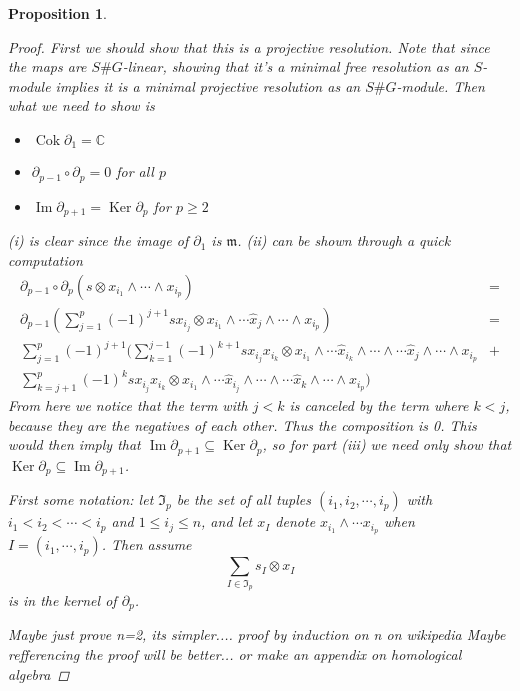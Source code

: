 \documentclass[11pt, a4paper, english]{article}
\newtheorem{prop}{Proposition}
\numberwithin{prop}{section}
\numberwithin{lemma}{section}
\numberwithin{theorem}{section}
\numberwithin{defin}{section}
\numberwithin{example}{section}
\newcommand{\C}{\mathbb{C}}
\DeclareMathOperator{\Image}{Im}
\DeclareMathOperator{\Ker}{Ker}
\DeclareMathOperator{\Cok}{Cok}
\begin{document}
\begin{prop}
\begin{proof}
First we should show that this is a projective resolution. Note that since the maps are $S\#G$-linear, showing that it's a minimal free resolution as an $S$-module implies it is a minimal projective resolution as an $S\#G$-module. Then what we need to show is 
\begin{itemize}
\item[(i)] $\Cok \partial_1 = \C$
\item[(ii)] $\partial_{p-1} \circ \partial_{p} = 0$ for all $p$
\item[(iii)] $\Image \partial_{p+1} = \Ker \partial_p$ for $p \geq 2$
\end{itemize}
(i) is clear since the image of $\partial_1$ is $\mathfrak{m}$. (ii) can be shown through a quick computation
\begin{align*}
\partial_{p-1} \circ \partial_{p}(s \otimes x_{i_1} \wedge \cdots \wedge x_{i_p}) &=\\ 
\partial_{p-1} \left(\sum_{j=1}^p (-1)^{j+1} sx_{i_j} \otimes x_{i_1} \wedge \cdots \hat{x}_j \wedge \cdots \wedge x_{i_p} \right)&=\\
\sum_{j=1}^p (-1)^{j+1} \Bigg(\sum_{k=1}^{j-1} (-1)^{k+1} sx_{i_j}x_{i_k} \otimes x_{i_1}\wedge \cdots \hat{x}_{i_k} \wedge \cdots \wedge \cdots \hat{x}_j \wedge \cdots \wedge x_{i_p}& +\\
\sum_{k=j+1}^{p} (-1)^k sx_{i_j}x_{i_k} \otimes x_{i_1}\wedge \cdots \hat{x}_{i_j} \wedge \cdots \wedge \cdots \hat{x}_k \wedge \cdots \wedge x_{i_p}\Bigg) &
\end{align*}
From here we notice that the term with $j < k$ is canceled by the term where $k < j$, because they are the negatives of each other. Thus the composition is 0. This would then imply that $\Image \partial_{p+1} \subseteq \Ker \partial_p$, so for part (iii) we need only show that $\Ker \partial_p \subseteq \Image \partial_{p+1}$.

First some notation: let $\mathfrak{I}_p$ be the set of all tuples $(i_1, i_2, \cdots, i_p)$ with $i_1 < i_2 < \cdots < i_p$ and $1 \leq i_j \leq n$, and let $x_I$ denote $x_{i_1} \wedge \cdots x_{i_p}$ when $I=(i_1, \cdots, i_p)$. Then assume $$ \sum_{I \in \mathfrak{I}_p} s_I \otimes x_I$$ is in the kernel of $\partial_p$. 


Maybe just prove n=2, its simpler....
proof by induction on n on wikipedia %
{\color{red}Maybe refferencing the proof will be better... or make an appendix on homological algebra}


\end{proof}
\end{prop}
\end{document}
